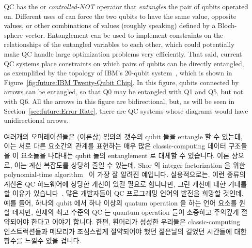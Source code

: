 QC has the  or \emph{controlled-NOT} operator that
\emph{entangles} the pair of qubits operated on.
Different uses of  can force the two qubits to have the same
value, opposite values, or other combinations of values (roughly speaking)
defined by a Bloch-sphere vector.
Entanglement can be used to implement constraints
on the relationships of the entangled variables to each other, which
could potentially make QC handle large optimization problems very
efficiently.
That said, current QC systems place constraints on which pairs of
qubits can be directly entangled, as exemplified by the topology
of IBM's 20-qubit system~\cite{IBMResearch2018QCsystems}, which is shown in
Figure~\ref{fig:future:IBM Twenty-Qubit Chip}.
In this figure, qubits connected by arrows can be entangled, so that
Q0 may be entangled with Q1 and Q5, but not with Q6.
All the arrows in this figure are bidirectional, but, as will be seen in
Section~\ref{sec:future:Error Rate},
there are QC systems whose diagrams would have unidirectional arrows.
\fi

여러개의  오퍼레이션들은 (이론상) 임의의 갯수의 qubit 들을 entangle
할 수 있는데, 이는 서로 다른 요소간의 관계를 표현하는 매우 많은
classic-computing 데이터 구조들을 이 요소들을 나타내는 qubit 들의 entanglement
로 대체할 수 있습니다.
이론 상으로, 이는 계산 복잡도를 상당히 줄일 수 있는데, Shor 의 integer
factorization 을 위한 polynomial-time
algorithm~\cite{Shor:1997:PAP:264393.264406} 이 가장 잘 알려진 예입니다.
실용적으로는, 이런 종류의 계산은 QC 하드웨어에 상당한 개선이 있길 필요로
합니다만, 그런 개선에 대한 기대를 할 이유가
있습니다~\cite{RobertMcConnell2015QC-Entangle3000Atoms}.
많은 개발자들이 QC 프로그래밍 언어의 발전을 희망할 것인데, 예를 들어, 하나의
qubit 에서 하나 이상의 quatum operation 을 하는 언어 요소를 원할 테지만, 현재의
최고 수준의 QC 는 quantum operation 들이 소중하고 주의깊게 절약되어야 한다고
이야기 합니다.
한편, 흰머리가 성성한 우리들은 classic-computing 인스트럭션들과 메모리가
조심스럽게 절약되어야 했던 젊은날의 길었던 시간들에 대한 향수를 느낄수 있을
겁니다.
\iffalse

